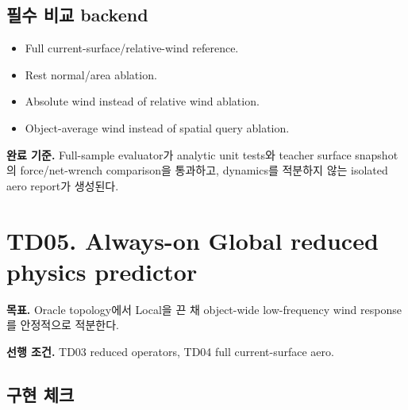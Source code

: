\documentclass[10pt,a4paper]{article}
\begin{document}
\subsection*{필수 비교 backend}

\begin{itemize}
  \item Full current-surface/relative-wind reference.
  \item Rest normal/area ablation.
  \item Absolute wind instead of relative wind ablation.
  \item Object-average wind instead of spatial query ablation.
\end{itemize}

\textbf{완료 기준.}
Full-sample evaluator가 analytic unit tests와 teacher surface snapshot의 force/net-wrench comparison을 통과하고,
dynamics를 적분하지 않는 isolated aero report가 생성된다.

\section{TD05. Always-on Global reduced physics predictor}

\textbf{목표.}
Oracle topology에서 Local을 끈 채 object-wide low-frequency wind response를 안정적으로 적분한다.

\textbf{선행 조건.} TD03 reduced operators, TD04 full current-surface aero.

\subsection*{구현 체크}
\end{document}
